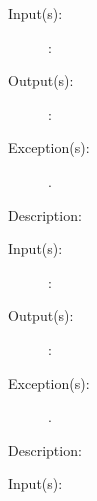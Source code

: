 \begin{description}
\begin{description}
	\item[Input(s): ]
		\begin{description}\item[]
		\item[: ]
		\end{description}
	\item[Output(s): ]
		\begin{description}\item[]
		\item[: ]
		\end{description}
	\item[Exception(s): ]
		\begin{description}\item[]
		\item[.]
		\end{description}
	\item[Description: ]
	\end{description}
\label{thd_}
\item[{\cfunc[]{thd\_}{}}: ]
	\begin{description}\item[]
	\item[Input(s): ]
		\begin{description}\item[]
		\item[: ]
		\end{description}
	\item[Output(s): ]
		\begin{description}\item[]
		\item[: ]
		\end{description}
	\item[Exception(s): ]
		\begin{description}\item[]
		\item[.]
		\end{description}
	\item[Description: ]
	\end{description}
\label{thd_}
\item[{\cfunc[]{thd\_}{}}: ]
	\begin{description}\item[]
	\item[Input(s): ]
		\begin{description}\item[]

\end{description}
\end{description}
\end{description}
